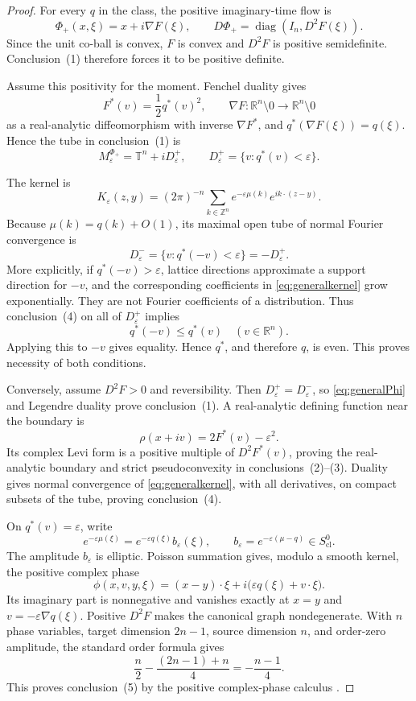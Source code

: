 \documentclass[11pt]{article}
\theoremstyle{remark}
\newcommand{\T}{\mathbb T}
\newcommand{\R}{\mathbb R}
\newcommand{\Z}{\mathbb Z}
\newcommand{\eps}{\varepsilon}
\begin{document}
\begin{proof}
For every $q$ in the class, the positive imaginary-time flow is
\begin{equation}\label{eq:generalPhi}
 \Phi_+(x,\xi)=x+i\nabla F(\xi),
 \qquad D\Phi_+=\operatorname{diag}(I_n,D^2F(\xi)).
\end{equation}
Since the unit co-ball is convex, $F$ is convex and $D^2F$ is positive
semidefinite.  Conclusion~(1) therefore forces it to be positive definite.

Assume this positivity for the moment.  Fenchel duality gives
\[
 F^*(v)=\frac12q^*(v)^2,
 \qquad
 \nabla F:\R^n\setminus0\longrightarrow\R^n\setminus0
\]
as a real-analytic diffeomorphism with inverse $\nabla F^*$, and
$q^*(\nabla F(\xi))=q(\xi)$.  Hence the tube in conclusion~(1) is
\begin{equation}\label{eq:positiveTube}
 M_\eps^{\Phi_+}=\T^n+iD_\eps^+,
 \qquad D_\eps^+=\{v:q^*(v)<\eps\}.
\end{equation}

The kernel is
\begin{equation}\label{eq:generalkernel}
 K_\eps(z,y)=(2\pi)^{-n}\sum_{k\in\Z^n}
 e^{-\eps\mu(k)}e^{ik\cdot(z-y)}.
\end{equation}
Because $\mu(k)=q(k)+O(1)$, its maximal open tube of normal Fourier
convergence is
\begin{equation}\label{eq:negativeTube}
 D_\eps^-=\{v:q^*(-v)<\eps\}=-D_\eps^+.
\end{equation}
More explicitly, if $q^*(-v)>\eps$, lattice directions approximate a support
direction for $-v$, and the corresponding coefficients in
\eqref{eq:generalkernel} grow exponentially.  They are not Fourier
coefficients of a distribution.  Thus conclusion~(4) on all of
$D_\eps^+$ implies
\[
 q^*(-v)\leq q^*(v)\quad(v\in\R^n).
\]
Applying this to $-v$ gives equality.  Hence $q^*$, and therefore $q$, is
even.  This proves necessity of both conditions.

Conversely, assume $D^2F>0$ and reversibility.  Then
$D_\eps^+=D_\eps^-$, so \eqref{eq:generalPhi} and Legendre duality prove
conclusion~(1).  A real-analytic defining function near the boundary is
\[
 \rho(x+iv)=2F^*(v)-\eps^2.
\]
Its complex Levi form is a positive multiple of $D^2F^*(v)$, proving the
real-analytic boundary and strict pseudoconvexity in conclusions~(2)--(3).
Duality gives normal convergence of \eqref{eq:generalkernel}, with all
derivatives, on compact subsets of the tube, proving conclusion~(4).

On $q^*(v)=\eps$, write
\[
 e^{-\eps\mu(\xi)}
 =e^{-\eps q(\xi)}b_\eps(\xi),
 \qquad b_\eps=e^{-\eps(\mu-q)}\in S^0_{\mathrm{cl}}.
\]
The amplitude $b_\eps$ is elliptic.  Poisson summation gives, modulo a smooth
kernel, the positive complex phase
\[
 \phi(x,v,y,\xi)
 =(x-y)\cdot\xi+i\bigl(\eps q(\xi)+v\cdot\xi\bigr).
\]
Its imaginary part is nonnegative and vanishes exactly at
$x=y$ and $v=-\eps\nabla q(\xi)$.  Positive $D^2F$ makes the canonical graph
nondegenerate.  With $n$ phase variables, target dimension $2n-1$, source
dimension $n$, and order-zero amplitude, the standard order formula gives
\[
 \frac n2-\frac{(2n-1)+n}{4}=-\frac{n-1}{4}.
\]
This proves conclusion~(5) by the positive complex-phase calculus
\cite{Hormander,MelinSjostrand}.


\end{proof}
\end{document}
